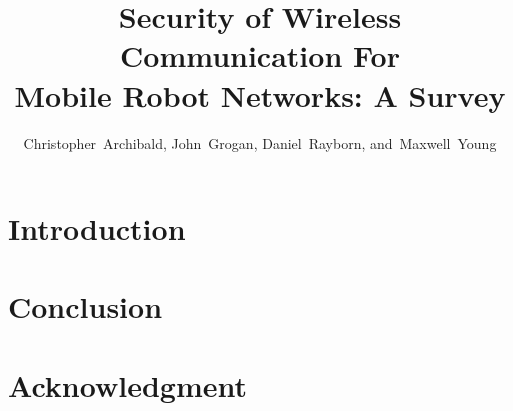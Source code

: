 \documentclass[journal]{IEEEtran}
\begin{document}
\title{Security of Wireless Communication For \\Mobile Robot Networks: A Survey}

\author{Christopher~Archibald,
        John~Grogan,
        Daniel~Rayborn,
        and~Maxwell~Young%
}

\maketitle

\begin{abstract}
\end{abstract}

\begin{IEEEkeywords}
\end{IEEEkeywords}









\IEEEpeerreviewmaketitle

\section{Introduction}

\section{Conclusion}

\section*{Acknowledgment}



\end{document}
